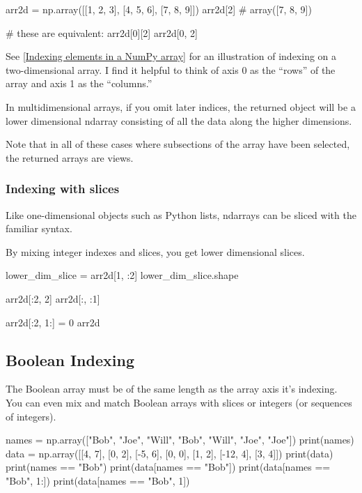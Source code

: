 \begin{pyc}
arr2d = np.array([[1, 2, 3], [4, 5, 6], [7, 8, 9]])
arr2d[2]
# array([7, 8, 9])

# these are equivalent:
arr2d[0][2]
arr2d[0, 2]
\end{pyc}

See \autoref{Indexing elements in a NumPy array} for an illustration of indexing on a two-dimensional array. I find it helpful to think of axis 0 as the “rows” of the array and axis 1 as the “columns.”


In multidimensional arrays, if you omit later indices, the returned object will be a
lower dimensional ndarray consisting of all the data along the higher dimensions. 

\begin{pyc}
    
\end{pyc}

Note that in all of these cases where subsections of the array have been selected, the
returned arrays are views.

\subsubsection{Indexing with slices}
Like one-dimensional objects such as Python lists, ndarrays can be sliced with the
familiar syntax.

By mixing integer indexes and slices, you get lower dimensional slices.


\begin{pyc}
lower_dim_slice = arr2d[1, :2]
lower_dim_slice.shape

arr2d[:2, 2]
arr2d[:, :1]

arr2d[:2, 1:] = 0
arr2d
\end{pyc}
\subsection{Boolean Indexing}
The Boolean array must be of the same length as the array axis it's indexing. You can even mix and match Boolean arrays with slices or integers (or sequences of integers).

\begin{pyc}
names = np.array(["Bob", "Joe", "Will", "Bob", "Will", "Joe", "Joe"])
print(names)
data = np.array([[4, 7], [0, 2], [-5, 6], [0, 0], [1, 2], [-12, 4], [3, 4]])
print(data)
print(names == "Bob")
print(data[names == "Bob"])
print(data[names == "Bob", 1:])
print(data[names == "Bob", 1])
\end{pyc}

